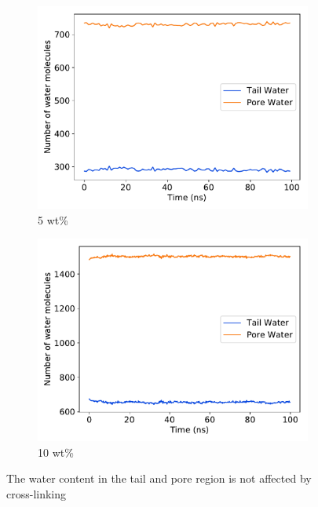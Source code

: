 \documentclass{article}
\begin{document}
  \begin{figure}[!htb]
  \centering
  \begin{subfigure}{0.45\textwidth}
  \includegraphics[width=\textwidth]{5wt_offset_xlinked_equil.pdf}
  \caption{5 wt\%}\label{fig:5wt_offset_xlinked_equil}
  \end{subfigure}
  \begin{subfigure}{0.45\textwidth}
  \includegraphics[width=\textwidth]{10wt_offset_xlinked_equil.pdf}
  \caption{10 wt\%}\label{fig:10wt_offset_xlinked_equil}
  \end{subfigure}
  \caption{The water content in the tail and pore region is not affected
  by cross-linking}\label{fig:solvation_equilibration}
  \end{figure}  
  
\end{document}
